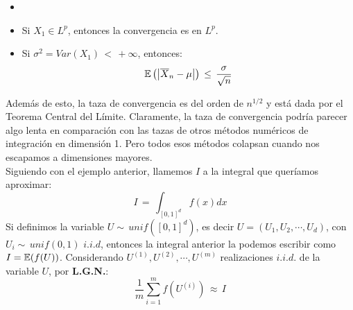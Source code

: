 \begin{obs}
\begin{itemize}
    \item[]
    \item Si $X_1 \in L^p$, entonces la convergencia es en $L^p$.
    \item Si $\sigma^2 = Var(X_1)\,<\,+\infty$, entonces:
    \[\mathbb E\left( \left|\overline{X}_n-\mu\right|\right)\,\leq\,\frac{\sigma}{\sqrt{n}}\]
\end{itemize}
\end{obs}
Además de esto, la taza de convergencia es del orden de $n^{1/2}$ y está dada por el Teorema Central del Límite. Claramente, la taza de convergencia podría parecer algo lenta en comparación con las tazas de otros métodos numéricos de integración en dimensión 1. Pero todos esos métodos colapsan cuando nos escapamos a dimensiones mayores.\newline \\
Siguiendo con el ejemplo anterior, llamemos $I$ a la integral que queríamos aproximar:
\[I\,=\,\int_{[0,1]^d}f(x)dx\]
Si definimos la variable $U\sim\,unif([0,1]^d)$, es decir $U=(U_1,U_2,\cdots,U_d)$, con $U_i\sim\,unif(0,1)$ $i.i.d$, entonces la integral anterior la podemos escribir como $I=\mathbb E(f(U))$. Considerando $U^{(1)},U^{(2)},\cdots,U^{(m)}$ realizaciones $i.i.d.$ de la variable $U$, por \textbf{L.G.N.}:
\[\frac{1}{m}\sum_{i=1}^m f(U^{(i)})\,\approx\,I\]

